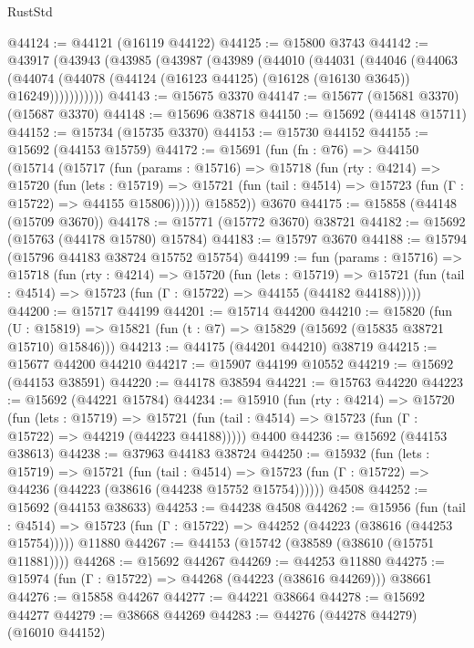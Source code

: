 \begin{lexlean}{RustStd}
\begin{coremodule}
@44124 := @44121 (@16119 @44122)
@44125 := @15800 @3743
@44142 := @43917
    (@43943
      (@43985
        (@43987
          (@43989
            (@44010
              (@44031
                (@44046
                  (@44063
                    (@44074
                      (@44078 (@44124 (@16123 @44125) (@16128 (@16130 @3645)) @16249)))))))))))
@44143 := @15675 @3370
@44147 := @15677 (@15681 @3370) (@15687 @3370)
@44148 := @15696 @38718
@44150 := @15692 (@44148 @15711)
@44152 := @15734 (@15735 @3370)
@44153 := @15730 @44152
@44155 := @15692 (@44153 @15759)
@44172 := @15691
    (fun (fn : @76) =>
    @44150
      (@15714
        (@15717
          (fun (params : @15716) =>
          @15718
            (fun (rty : @4214) =>
            @15720
              (fun (lets : @15719) =>
              @15721 (fun (tail : @4514) => @15723 (fun (Γ : @15722) => @44155 @15806))))))
        @15852))
    @3670
@44175 := @15858 (@44148 (@15709 @3670))
@44178 := @15771 (@15772 @3670) @38721
@44182 := @15692 (@15763 (@44178 @15780) @15784)
@44183 := @15797 @3670
@44188 := @15794 (@15796 @44183 @38724 @15752 @15754)
@44199 := fun (params : @15716) =>
  @15718
    (fun (rty : @4214) =>
    @15720
      (fun (lets : @15719) =>
      @15721 (fun (tail : @4514) => @15723 (fun (Γ : @15722) => @44155 (@44182 @44188)))))
@44200 := @15717 @44199
@44201 := @15714 @44200
@44210 := @15820
    (fun (U : @15819) => @15821 (fun (t : @7) => @15829 (@15692 (@15835 @38721 @15710) @15846)))
@44213 := @44175 (@44201 @44210) @38719
@44215 := @15677 @44200 @44210
@44217 := @15907 @44199 @10552
@44219 := @15692 (@44153 @38591)
@44220 := @44178 @38594
@44221 := @15763 @44220
@44223 := @15692 (@44221 @15784)
@44234 := @15910
    (fun (rty : @4214) =>
    @15720
      (fun (lets : @15719) =>
      @15721 (fun (tail : @4514) => @15723 (fun (Γ : @15722) => @44219 (@44223 @44188)))))
    @4400
@44236 := @15692 (@44153 @38613)
@44238 := @37963 @44183 @38724
@44250 := @15932
    (fun (lets : @15719) =>
    @15721
      (fun (tail : @4514) =>
      @15723 (fun (Γ : @15722) => @44236 (@44223 (@38616 (@44238 @15752 @15754))))))
    @4508
@44252 := @15692 (@44153 @38633)
@44253 := @44238 @4508
@44262 := @15956
    (fun (tail : @4514) => @15723 (fun (Γ : @15722) => @44252 (@44223 (@38616 (@44253 @15754)))))
    @11880
@44267 := @44153 (@15742 (@38589 (@38610 (@15751 @11881))))
@44268 := @15692 @44267
@44269 := @44253 @11880
@44275 := @15974 (fun (Γ : @15722) => @44268 (@44223 (@38616 @44269))) @38661
@44276 := @15858 @44267
@44277 := @44221 @38664
@44278 := @15692 @44277
@44279 := @38668 @44269
@44283 := @44276 (@44278 @44279) (@16010 @44152)

\end{coremodule}
\end{lexlean}

